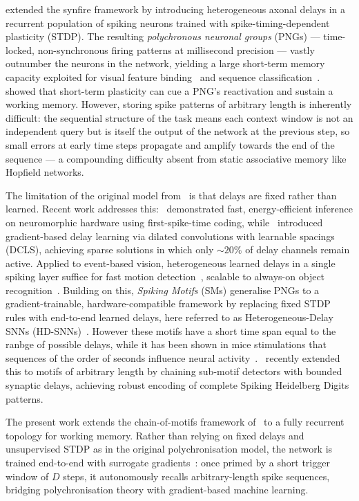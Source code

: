 \documentclass{scrartcl}
\newcommand{\citep}[1]{\parencite{#1}}
\newcommand{\citet}[1]{\textcite{#1}}
\begin{document}
\citet{Izhikevich2006} extended the synfire framework by introducing heterogeneous axonal delays in a recurrent population of spiking neurons trained with spike-timing-dependent plasticity (STDP). The resulting \emph{polychronous neuronal groups} (PNGs) --- time-locked, non-synchronous firing patterns at millisecond precision --- vastly outnumber the neurons in the network, yielding a large short-term memory capacity exploited for visual feature binding~\citep{Eguchi2018} and sequence classification~\citep{Paugam-Moisy2008}.~\citet{Szatmary2010} showed that short-term plasticity can cue a PNG's reactivation and sustain a working memory. However, storing spike patterns of arbitrary length is inherently difficult: the sequential structure of the task means each context window is not an independent query but is itself the output of the network at the previous step, so small errors at early time steps propagate and amplify towards the end of the sequence --- a compounding difficulty absent from static associative memory like Hopfield networks.

The limitation of the original model from~\citet{Izhikevich2006} is that delays are fixed rather than learned. Recent work addresses this:~\citet{Goltz2021} demonstrated fast, energy-efficient inference on neuromorphic hardware using first-spike-time coding, while~\citet{Hammouamri2023} introduced gradient-based delay learning via dilated convolutions with learnable spacings (DCLS), achieving sparse solutions in which only $\sim\!20\%$ of delay channels remain active. Applied to event-based vision, heterogeneous learned delays in a single spiking layer suffice for fast motion detection~\citep{Grimaldi2023a}, scalable to always-on object recognition~\citep{Grimaldi2024}. Building on this, \emph{Spiking Motifs} (SMs) generalise PNGs to a gradient-trainable, hardware-compatible framework by replacing fixed STDP rules with end-to-end learned delays, here referred to as Heterogeneous-Delay SNNs (HD-SNNs)~\citep{Perrinet2023}. However these motifs have a short time span equal to the ranbge of possible delays, while it has been shown in mice stimulations that sequences of the order of seconds influence neural activity~\citep{Deveau2026}.~\citet{Kronland-Martinet2026} recently extended this to motifs of arbitrary length by chaining sub-motif detectors with bounded synaptic delays, achieving robust encoding of complete Spiking Heidelberg Digits patterns.

The present work extends the chain-of-motifs framework of~\citet{Kronland-Martinet2026} to a fully recurrent topology for working memory. Rather than relying on fixed delays and unsupervised STDP as in the original polychronisation model, the network is trained end-to-end with surrogate gradients~\citep{Neftci2019a}: once primed by a short trigger window of $D$ steps, it autonomously recalls arbitrary-length spike sequences, bridging polychronisation theory with gradient-based machine learning.
\end{document}
